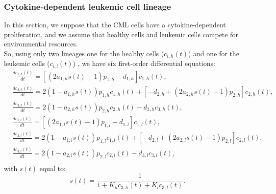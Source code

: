 \documentclass[a4paper,10pt]{article}
\begin{document}
\subsubsection{ Cytokine-dependent leukemic cell lineage}
In this section,
we suppose that 
the CML cells have a cytokine-dependent proliferation,
and we assume that healthy cells and leukemic cells compete for environmental
resources.\\
So, using only two lineages 
one for the healthy cells ($c_{i,h}(t)$) and one for 
the leukemic cells ($c_{i,l}(t)$) ,
we have six first-order differential equations:
\begin{equation}
\begin{array}{ll}
& \frac{dc_{1,h}(t)}{dt}= [(2a_{1,h}s(t)-1)p_{1,h}-d_{1,h}]c_{1,h}(t),\\
& \frac{dc_{2,h}(t)}{dt}=2(1-a_{1,h}s(t))p_{1,h}c_{1,h}(t) +[-d_{2,h}+(2a_{2,h}s(t)-1)p_{2,h}]c_{2,h}(t), \\
& \frac{dc_{3,h}(t)}{dt}=2(1-a_{2,h}s(t))p_{2,h}c_{2,h}(t)-d_{3,h}c_{3,h}(t), \\
& \frac{dc_{1,l}(t)}{dt}= [(2a_{1,l}s(t)-1)p_{1,l}-d_{1,l}]c_{1,l}(t), \\
& \frac{dc_{2,l}(t)}{dt}=2(1-a_{1,l}s(t))p_{1,l}c_{1,l}(t) +[-d_{2,l}+(2a_{2,l}s(t)-1)p_{2,l}]c_{2,l}(t), \\
& \frac{dc_{3,l}(t)}{dt}=2(1-a_{2,l}s(t))p_{2,l}c_{2,l}(t)-d_{3,l}c_{3,l}(t), \\
\end{array}
\label{eq:sist2}
\end{equation}
with $s(t)$ equal to:
\begin{equation}
s(t)=\frac{1}{1+K_hc_{3,h}(t)+K_lc_{3,l}(t)}.
\end{equation}
\end{document}
